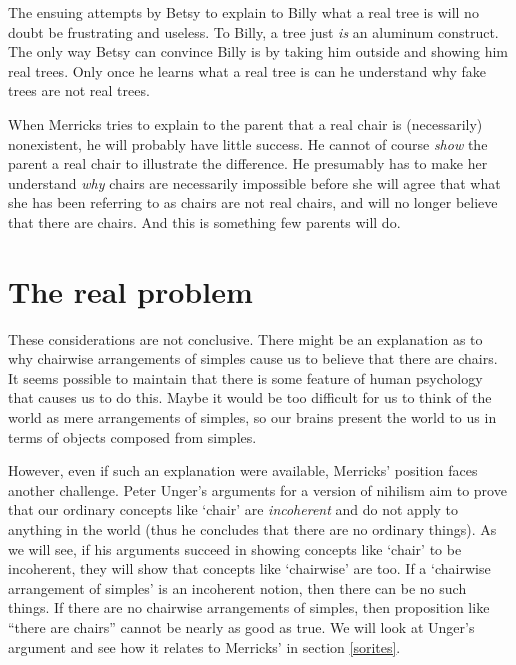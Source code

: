 \documentclass[11pt]{standalone} \newif\ifstandlone \standalonetrue
\begin{document}
\begin{spacing}{1.25}

The ensuing attempts by Betsy to explain to Billy what a real tree is
will no doubt be frustrating and useless.  To Billy, a tree just {\em
  is} an aluminum construct.  The only way Betsy can convince Billy is
by taking him outside and showing him real trees.  Only once he learns
what a real tree is can he understand why fake trees are not real
trees.

When Merricks tries to explain to the parent that a real chair is
(necessarily) nonexistent, he will probably have little success.  He
cannot of course {\em show} the parent a real chair to illustrate the
difference.  He presumably has to make her understand {\em why} chairs
are necessarily impossible before she will agree that what she has
been referring to as chairs are not real chairs, and will no longer
believe that there are chairs.  And this is something few parents will
do.

\section{The real problem}
These considerations are not conclusive.  There might be an
explanation as to why chairwise arrangements of simples cause us to
believe that there are chairs.  It seems possible to maintain that
there is some feature of human psychology that causes us to do this.
Maybe it would be too difficult for us to think of the world as mere
arrangements of simples, so our brains present the world to us in
terms of objects composed from simples.

However, even if such an explanation were available, Merricks'
position faces another challenge.  Peter Unger's arguments for a
version of nihilism aim to prove that our ordinary concepts like
`chair' are {\em incoherent} and do not apply to anything in the world
(thus he concludes that there are no ordinary things).  As we will
see, if his arguments succeed in showing concepts like `chair' to be
incoherent, they will show that concepts like `chairwise' are too.  If
a `chairwise arrangement of simples' is an incoherent notion, then
there can be no such things.  If there are no chairwise arrangements
of simples, then proposition like ``there are chairs'' cannot be
nearly as good as true.  We will look at Unger's argument and see how
it relates to Merricks' in section \ref{sorites}.

\ifstandalone
\end{spacing}


\fi
\end{document}
